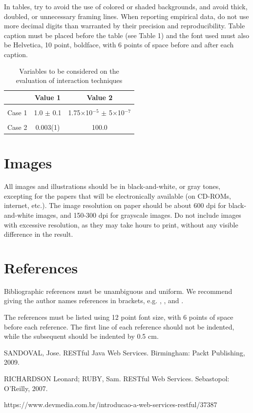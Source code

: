 \documentclass[12pt]{article}
\begin{document}
In tables, try to avoid the use of colored or shaded backgrounds, and avoid
thick, doubled, or unnecessary framing lines. When reporting empirical data,
do not use more decimal digits than warranted by their precision and
reproducibility. Table caption must be placed before the table (see Table 1)
and the font used must also be Helvetica, 10 point, boldface, with 6 points of
space before and after each caption.

\begin{table}[ht]
\centering
\caption{Variables to be considered on the evaluation of interaction
  techniques}
\label{tab:exTable1}
\smallskip
\begin{tabular}{|l|c|c|}
\hline
& Value 1 & Value 2\\[0.5ex]
\hline
&&\\[-2ex]
Case 1 & 1.0 $\pm$ 0.1 & 1.75$\times$10$^{-5}$ $\pm$ 5$\times$10$^{-7}$\\[0.5ex]
\hline
&&\\[-2ex]
Case 2 & 0.003(1) & 100.0\\[0.5ex]
\hline
\end{tabular}
\end{table}

\section{Images}

All images and illustrations should be in black-and-white, or gray tones,
excepting for the papers that will be electronically available (on CD-ROMs,
internet, etc.). The image resolution on paper should be about 600 dpi for
black-and-white images, and 150-300 dpi for grayscale images.  Do not include
images with excessive resolution, as they may take hours to print, without any
visible difference in the result. 

\section{References}

Bibliographic references must be unambiguous and uniform.  We recommend giving
the author names references in brackets, e.g. \cite{knuth:84},
\cite{boulic:91}, and \cite{smith:99}.

The references must be listed using 12 point font size, with 6 points of space
before each reference. The first line of each reference should not be
indented, while the subsequent should be indented by 0.5 cm.

SANDOVAL, Jose. RESTful Java Web Services. Birmingham: Packt Publishing,
2009.

RICHARDSON Leonard; RUBY, Sam. RESTful Web Services. Sebastopol: O'Reilly,
2007.

https://www.devmedia.com.br/introducao-a-web-services-restful/37387



\end{document}
